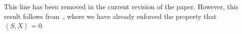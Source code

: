 \begin{response}

This line has been removed in the current revision of the paper. However, this result follows from~\cite[Proposition 2.10]{boumalDeterministicGuaranteesBurerMonteiro2020a}, where we have already enforced the property that $\left<S,X\right> = 0$. 


\end{response}

